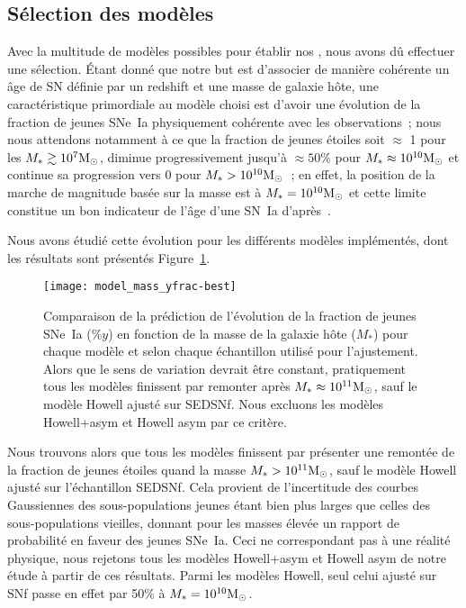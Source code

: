 \documentclass[../main/main.tex]{subfiles}
\begin{document}
\subsection{Sélection des modèles}\label{ssec:mmodsel}

Avec la multitude de modèles possibles pour établir nos \hostlib, nous avons dû
effectuer une sélection. Étant donné que notre but est d'associer de manière
cohérente un âge de SN définie par un redshift et une masse de galaxie hôte, une
caractéristique primordiale au modèle choisi est d'avoir une évolution de la
fraction de jeunes SNe~Ia physiquement cohérente avec les observations~; nous
nous attendons notamment à ce que la fraction de jeunes étoiles soit $\approx$ 1
pour les $M_* \gtrsim 10^7\si{\Msun}$, diminue progressivement jusqu'à $\approx
50\%$ pour $M_* \approx 10^{10}\si{\Msun}$ et continue sa progression vers 0
pour $M_* > 10^{10}\si{\Msun}$~; en effet, la position de la marche de magnitude
basée sur la masse est à $M_* = 10^{10}\si{\Msun}$ et cette limite constitue un
bon indicateur de l'âge d'une SN~Ia d'après~\cite{briday2022}.

Nous avons étudié cette évolution pour les différents modèles implémentés, dont
les résultats sont présentés Figure~\ref{fig:ypc}.

\begin{figure}[ht]
    \centerfloat
    \texttt{[image: model\_mass\_yfrac-best]}
    \caption[Comparaison de la prédiction de l'évolution de la fraction de
    jeunes SNe~Ia en fonction de la masse de la galaxie hôte]{Comparaison de la
        prédiction de l'évolution de la fraction de jeunes SNe~Ia ($\%y$) en
        fonction de la masse de la galaxie hôte ($M_*$) pour chaque modèle et
        selon chaque échantillon utilisé pour l'ajustement. Alors que le sens de
        variation devrait être constant, pratiquement tous les modèles finissent
        par remonter après $M_* \approx 10^{11}\si{\Msun}$, sauf le modèle
        Howell ajusté sur SEDSNf. Nous excluons les modèles Howell+asym et
    Howell asym par ce critère.}
    \label{fig:ypc}
\end{figure}

Nous trouvons alors que tous les modèles finissent par présenter une remontée de
la fraction de jeunes étoiles quand la masse $M_* > 10^{11}\si{\Msun}$, sauf le
modèle Howell ajusté sur l'échantillon SEDSNf. Cela provient de l'incertitude
des courbes Gaussiennes des sous-populations jeunes étant bien plus larges que
celles des sous-populations vieilles, donnant pour les masses élevée un rapport
de probabilité en faveur des jeunes SNe~Ia. Ceci ne correspondant pas à une
réalité physique, nous rejetons tous les modèles Howell+asym et Howell asym de
notre étude à partir de ces résultats. Parmi les modèles Howell, seul celui
ajusté sur SNf passe en effet par 50\% à $M_*=10^{10}\si{\Msun}$.
\end{document}

